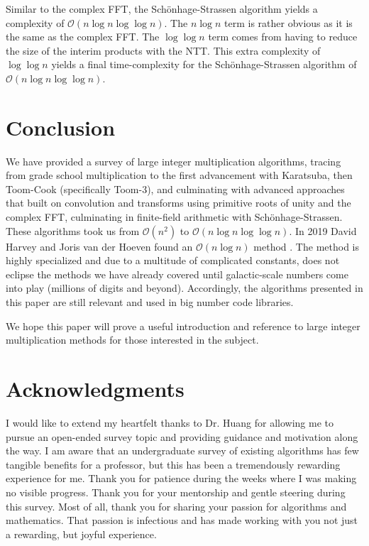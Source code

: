 \documentclass[psamsfonts,reqno]{amsart}
\theoremstyle{definition}
\theoremstyle{remark}
\numberwithin{equation}{section}
\begin{document}
Similar to the complex FFT, the Sch\"{o}nhage-Strassen algorithm yields a complexity of $\mathcal{O}(n \log{n} \log{\log{n}})$. The $n \log{n}$ term is rather obvious as it is the same as the complex FFT. The $\log{\log{n}}$ term comes from having to reduce the size of the interim products with the NTT. This extra complexity of $\log{\log{n}}$ yields a final time-complexity for the Sch\"{o}nhage-Strassen algorithm of $\mathcal{O}(n \log{n} \log{\log{n}})$.

\section{Conclusion}
We have provided a survey of large integer multiplication algorithms, tracing from grade school multiplication to the first advancement with Karatsuba, then Toom-Cook (specifically Toom-3), and culminating with advanced approaches that built on convolution and transforms using primitive roots of unity and the complex FFT, culminating in finite-field arithmetic with Sch\"{o}nhage-Strassen. These algorithms took us from $\mathcal{O}(n^2)$ to $\mathcal{O}(n \log{n} \log{\log{n}})$. In 2019 David Harvey and Joris van der Hoeven found an $\mathcal{O}(n \log{n})$ method \cite{harvey2021integer}. The method is highly specialized and due to a multitude of complicated constants, does not eclipse the methods we have already covered until galactic-scale numbers come into play (millions of digits and beyond). Accordingly, the algorithms presented in this paper are still relevant and used in big number code libraries.

We hope this paper will prove a useful introduction and reference to large integer multiplication methods for those interested in the subject.

\newpage

\section*{Acknowledgments} I would like to extend my heartfelt thanks to Dr. Huang for allowing me to pursue an open-ended survey topic and providing guidance and motivation along the way. I am aware that an undergraduate survey of existing algorithms has few tangible benefits for a professor, but this has been a tremendously rewarding experience for me. Thank you for patience during the weeks where I was making no visible progress. Thank you for your mentorship and gentle steering during this survey. Most of all, thank you for sharing your passion for algorithms and mathematics. That passion is infectious and has made working with you not just a rewarding, but joyful experience. 

\printbibliography
\end{document}
